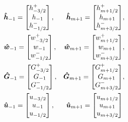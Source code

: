 \begin{align*}
&\boldsymbol{\hat{h}}_{-1} = \begin{bmatrix}
h^+_{-3/2} \\ h_{-1} \\ h^-_{-1/2}\end{bmatrix},&\boldsymbol{\hat{h}}_{m+1} = \begin{bmatrix}
h^+_{m+1/2} \\ h_{m+1} \\h^-_{m+3/2}\end{bmatrix}&, \\
&\boldsymbol{\hat{w}}_{-1} = \begin{bmatrix}
w^+_{-3/2} \\ w_{-1} \\ w^-_{-1/2}\end{bmatrix},&\boldsymbol{\hat{w}}_{m+1} = \begin{bmatrix}
w^+_{m+1/2} \\ w_{m+1} \\ w^-_{m+3/2}\end{bmatrix}&, \\
&\boldsymbol{\hat{G}}_{-1} = \begin{bmatrix}
G^+_{-3/2} \\ G_{-1} \\ G^-_{-1/2}\end{bmatrix},&\boldsymbol{\hat{G}}_{m+1} = \begin{bmatrix}
G^+_{m+1/2} \\ G_{m+1} \\ G^-_{m+3/2}\end{bmatrix}&, \\
&\boldsymbol{\hat{u}}_{-1} = \begin{bmatrix}
u_{-3/2} \\ u_{-1} \\ u_{-1/2}\end{bmatrix},&\boldsymbol{\hat{u}}_{m+1} = \begin{bmatrix}
u_{m+1/2} \\ u_{m+1} \\ u_{m+3/2}\end{bmatrix}&
\end{align*}
